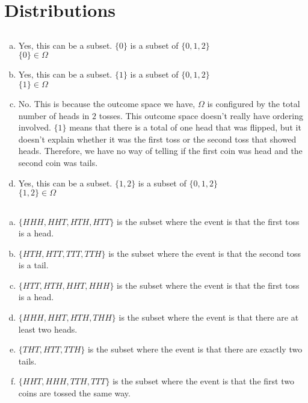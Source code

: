 \documentclass[10pt]{report}
\begin{document}
\section{\sc\color{cit}Distributions}
\setcounter{subsection}{3}
\subsection{}
 \begin{enumerate}[(a)]
 \item Yes, this can be a subset. $\{0\} $ is a subset of $\{0,1,2\} $ \ \\
 $\{0\} \in \Omega $
 \item  Yes, this can be a subset. $\{1\} $ is a subset of $\{0,1,2\} $\ \\ $\{1\} \in \Omega $
 \item No. This is because the outcome space we have, $\Omega $ is configured by the total number of heads in $2 $ tosses. This outcome space doesn't really have ordering involved. $\{1\} $ means that there is a total of one head that was flipped, but it doesn't explain whether it was the first toss or the second toss that showed heads. Therefore, we have no way of telling if the first coin was head and the second coin was tails.
 \item Yes, this can be a subset. $\{1,2\} $ is a subset of $\{0,1,2\} $ \ \\
 $\{1,2\} \in \Omega $
\end{enumerate}
\subsection{}
 \begin{enumerate}[(a)]
 \item $\{HHH, HHT, HTH, HTT\} $ is the subset where the event is that the first toss is a head.
 \item $\{HTH, HTT, TTT, TTH\} $ is the subset where the event is that the second toss is a tail.
 \item $\{HTT, HTH, HHT, HHH\} $ is the subset where the event is that the first toss is a head.
 \item $\{HHH, HHT, HTH, THH\} $ is the subset where the event is that there are at least two heads.
 \item $\{THT, HTT, TTH\} $ is the subset where the event is that there are exactly two tails. 
 \item $\{HHT, HHH, TTH, TTT\} $ is the subset where the event is that the first two coins are tossed the same way.
\end{enumerate}
\end{document}
